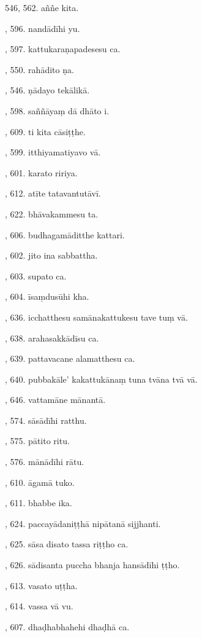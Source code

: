 546, 562. aññe kita.\par {}, 596. nandādīhi yu.\par {}, 597. kattukaraṇapadesesu ca.\par {}, 550. rahādito ṇa.\par {}, 546. ṇādayo tekālikā.\par {}, 598. saññāyaṃ dā dhāto i.\par {}, 609. ti kita cāsiṭṭhe.\par {}, 599. itthiyamatiyavo vā.\par {}, 601. karato ririya.\par {}, 612. atīte tatavantutāvī.\par {}, 622. bhāvakammesu ta.\par {}, 606. budhagamāditthe kattari.\par {}, 602. jito ina sabbattha.\par {}, 603. supato ca.\par {}, 604. īsaṃdusūhi kha.\par {}, 636. icchatthesu samānakattukesu tave tuṃ vā.\par {}, 638. arahasakkādīsu ca.\par {}, 639. pattavacane alamatthesu ca.\par {}, 640. pubbakāle’ kakattukānaṃ tuna tvāna tvā vā.\par {}, 646. vattamāne mānantā.\par {}, 574. sāsādīhi ratthu.\par {}, 575. pātito ritu.\par {}, 576. mānādīhi rātu.\par {}, 610. āgamā tuko.\par {}, 611. bhabbe ika.\par {}, 624. paccayādaniṭṭhā nipātanā sijjhanti.\par {}, 625. sāsa disato tassa riṭṭho ca.\par {}, 626. sādisanta puccha bhanja hansādīhi ṭṭho.\par {}, 613. vasato uṭṭha.\par {}, 614. vassa vā vu.\par {}, 607. dhaḍhabhahehi dhaḍhā ca.\par \noindent
